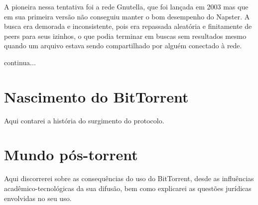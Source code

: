 A pioneira nessa tentativa foi a rede Gnutella, que foi lançada em 2003 mas que em sua
primeira versão não conseguiu manter o bom desempenho do Napster. A busca era demorada e
inconsistente, pois era repassada aleatória e finitamente de peers para seus izinhos, o
que podia terminar em buscas sem resultados mesmo quando um arquivo estava sendo
compartilhado por alguém conectado à rede.

continua...

\section{Nascimento do BitTorrent}

Aqui contarei a história do surgimento do protocolo.

\section{Mundo pós-torrent}

Aqui discorrerei sobre as consequências do uso do BitTorrent, desde as influências acadêmico-tecnológicas da sua difusão, bem como explicarei as questões jurídicas envolvidas no seu uso.

\clearpage
